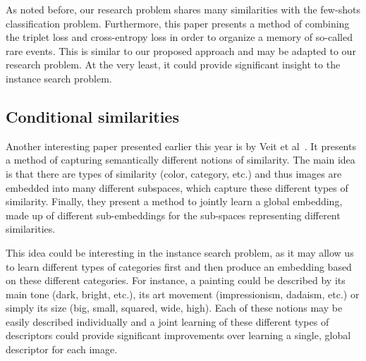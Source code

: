 As noted before, our research problem shares many similarities with the
few-shots classification problem. Furthermore, this paper presents a
method of combining the triplet loss and cross-entropy loss in order to
organize a memory of so-called rare events. This is similar to our proposed
approach and may be adapted to our research problem. At the very least,
it could provide significant insight to the instance search problem.

\subsection{Conditional similarities}
Another interesting paper presented earlier this year is by
Veit et al~\cite{veit_conditional_2016}. It presents a method of
capturing semantically different notions of similarity. The main idea
is that there are types of similarity (color, category, etc.) and
thus images are embedded into many different subspaces, which capture
these different types of similarity. Finally, they present a method
to jointly learn a global embedding, made up of different sub-embeddings
for the sub-spaces representing different similarities.

This idea could be interesting in the instance search problem, as it
may allow us to learn different types of categories first and then produce
an embedding based on these different categories. For instance, a painting
could be described by its main tone (dark, bright, etc.), its art movement
(impressionism, dadaism, etc.) or simply its size (big, small, squared,
wide, high). Each of these notions may be easily described individually
and a joint learning of these different types of descriptors could provide
significant improvements over learning a single, global descriptor for
each image.
